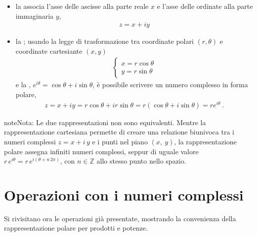 \documentclass[letterpaper,10pt,italian]{jupyterBook}
\begin{document}
\begin{itemize}
\item {} 
\sphinxAtStartPar
la  associa l’asse delle ascisse alla parte reale \(x\) e l’asse delle ordinate alla parte immaginaria \(y\),
\begin{equation*}
\begin{split}z = x + i y\end{split}
\end{equation*}
\item {} 
\sphinxAtStartPar
la ; usando la legge di trasformazione tra coordinate polari \((r, \theta)\) e coordinate cartesiante \((x,y)\)
\begin{equation*}
\begin{split}\begin{cases}
    x = r \cos \theta \\
    y = r \sin \theta
  \end{cases}\end{split}
\end{equation*}
\sphinxAtStartPar
e la {\hyperref[\detokenize{ch/algebra/complex-algebra-notes:math-hs-algebra-complex-notes-euler}]{}}, \(e^{i \theta} = \cos \theta + i \sin \theta\), è possibile scrivere un numero complesso in forma polare,
\begin{equation*}
\begin{split}z = x + i y = r \cos \theta + i r \sin \theta = r \left( \cos \theta + i \sin \theta \right) = r e^{i \theta} \ .\end{split}
\end{equation*}
\end{itemize}

\begin{sphinxadmonition}{note}{Nota:}
\sphinxAtStartPar
Le due rappresentazioni non sono equivalenti. Mentre la rappresentazione cartesiana permette di creare una relazione biunivoca tra i numeri complessi \(z = x + i \, y\) e i punti nel piano \((x, \ y)\), la rappresentazione polare assegna infiniti numeri complessi, seppur di uguale valore \(r \, e^{i \theta} = r \, e^{i (\theta + n \, 2 \pi)}\), con \(n \in \mathbb{Z}\) allo stesso punto nello spazio.
\end{sphinxadmonition}


\section{Operazioni con i numeri complessi}
\label{\detokenize{ch/algebra/complex-algebra:operazioni-con-i-numeri-complessi}}\label{\detokenize{ch/algebra/complex-algebra:math-hs-algebra-complex-operations}}
\sphinxAtStartPar
Si rivisitano ora le operazioni già presentate, mostrando la convenienza della rappresentazione polare per prodotti e potenze.
\end{document}
